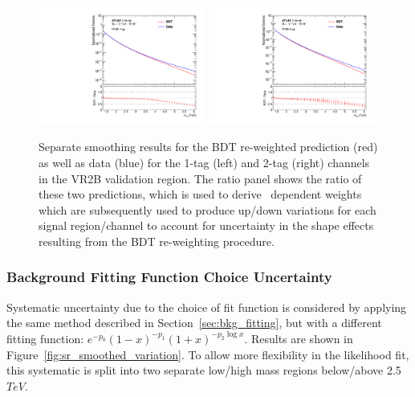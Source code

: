 \begin{figure}[htbp!]
\begin{center}
\includegraphics[width=0.49\textwidth]{VHqqbb_BDTShapeSystematic_VR2B_1tag.pdf}
\includegraphics[width=0.49\textwidth]{VHqqbb_BDTShapeSystematic_VR2B_2tag.pdf}
\end{center}
\caption{Separate smoothing results for the BDT re-weighted prediction (red) as well as data (blue) for the 1-tag (left) and 2-tag (right) channels in the VR2B validation region.
    The ratio panel shows the ratio of these two predictions, which is used to derive \mvh\ dependent weights which are subsequently used to produce up/down variations for each signal region/channel to account for uncertainty in the shape effects resulting from the BDT re-weighting procedure.
}
\label{fig:bdt_shape_syst}
\end{figure}

\subsubsection{Background Fitting Function Choice Uncertainty}
Systematic uncertainty due to the choice of fit function is considered by applying the same method described in Section~\ref{sec:bkg_fitting}, but with a different fitting function: $e^{-p_0} \left(1 - x\right)^{-p_1} \left(1+x\right)^{-p_2 \log{x}}$.
Results are shown in Figure~\ref{fig:sr_smoothed_variation}.
To allow more flexibility in the likelihood fit, this systematic is split into two separate low/high mass regions below/above 2.5 $TeV$.

